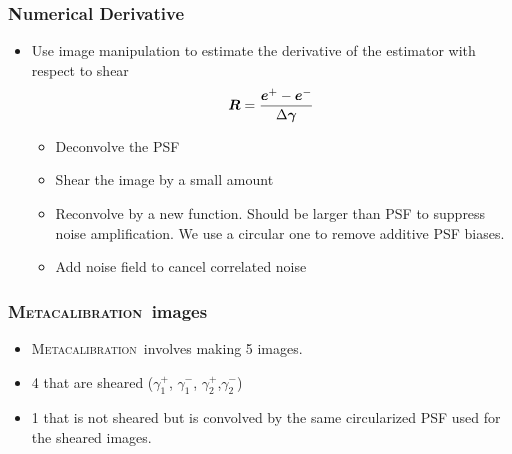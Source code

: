 \documentclass{beamer}
\newcommand{\Mcal}{\textsc{Metacalibration}}
\newcommand{\mcalR}{\mbox{\boldmath $R$}}
\newcommand{\vecg}{\mbox{\boldmath $\gamma$}}
\newcommand{\vest}{\mbox{\boldmath $e$}}
\begin{document}
\frame
{
    \frametitle{Numerical Derivative}

 

       \begin{itemize}

        \item Use image manipulation to estimate the derivative of the
            estimator with respect to shear
            {\color{gold}
                \begin{equation}
                    \mcalR = \frac{\vest^+ - \vest^-}{\Delta \vecg} \nonumber 
                \end{equation}
            }
            \begin{itemize}
                \item Deconvolve the PSF
                \item Shear the image by a small amount
                \item Reconvolve by a new function.  Should be larger than PSF to suppress
                    noise amplification.  We use a circular one to remove
                    additive PSF biases.

                \item {\color{lightsteelblue} Add noise field to cancel correlated noise}
            \end{itemize}


    \end{itemize}

}

\frame
{
    \frametitle{\Mcal\ images}

 

    \begin{itemize}
        \item \Mcal\ involves making 5 images.
        \item 4 that are sheared 
            ($\gamma_1^+$, $\gamma_1^-$, $\gamma_2^+$,$\gamma_2^-$)
        \item 1 that is not sheared but is convolved by the same circularized
            PSF used for the sheared images.


    \end{itemize}

}
\end{document}
